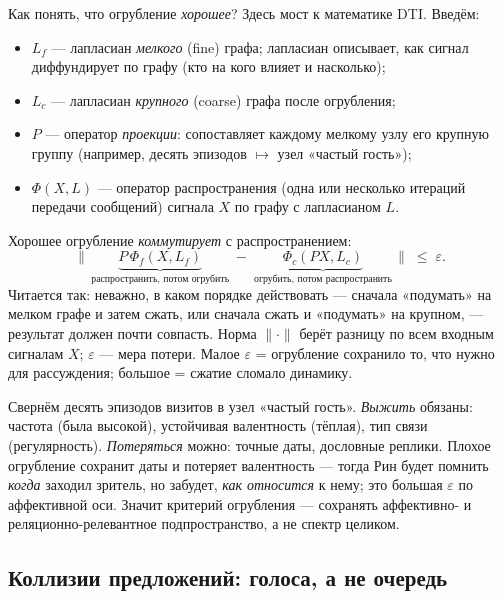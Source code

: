 Как понять, что огрубление \emph{хорошее}? Здесь мост к математике DTI. Введём:
\begin{itemize}\itemsep1pt
\item $L_f$ — лапласиан \emph{мелкого} (fine) графа; лапласиан описывает, как сигнал
диффундирует по графу (кто на кого влияет и насколько);
\item $L_c$ — лапласиан \emph{крупного} (coarse) графа после огрубления;
\item $P$ — оператор \emph{проекции}: сопоставляет каждому мелкому узлу его крупную
группу (например, десять эпизодов $\mapsto$ узел «частый гость»);
\item $\Phi(X,L)$ — оператор распространения (одна или несколько итераций передачи
сообщений) сигнала $X$ по графу с лапласианом $L$.
\end{itemize}
Хорошее огрубление \emph{коммутирует} с распространением:
\begin{equation}
\big\|\,\underbrace{P\,\Phi_f(X,L_f)}_{\text{распространить, потом огрубить}}
\;-\;\underbrace{\Phi_c(PX,L_c)}_{\text{огрубить, потом распространить}}\,\big\|
\;\le\;\varepsilon .
\label{eq:commute}
\end{equation}
Читается так: неважно, в каком порядке действовать — сначала «подумать» на мелком
графе и затем сжать, или сначала сжать и «подумать» на крупном, — результат должен
почти совпасть. Норма $\|\cdot\|$ берёт разницу по всем входным сигналам $X$;
$\varepsilon$ — мера потери. Малое $\varepsilon$ = огрубление сохранило то, что нужно
для рассуждения; большое = сжатие сломало динамику.

\begin{workedbox}
Свернём десять эпизодов визитов в узел «частый гость». \emph{Выжить} обязаны:
частота (была высокой), устойчивая валентность (тёплая), тип связи (регулярность).
\emph{Потеряться} можно: точные даты, дословные реплики. Плохое огрубление сохранит
даты и потеряет валентность — тогда Рин будет помнить \emph{когда} заходил зритель,
но забудет, \emph{как относится} к нему; это большая $\varepsilon$ по аффективной
оси. Значит критерий огрубления — сохранять аффективно- и реляционно-релевантное
подпространство, а не спектр целиком.
\end{workedbox}

\subsection{Коллизии предложений: голоса, а не очередь}
\label{sec:consolidation-collisions}

